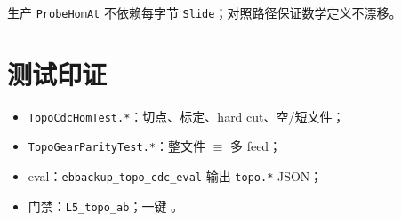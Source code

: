 生产 \texttt{ProbeHomAt} 不依赖每字节 \texttt{Slide}；对照路径保证数学定义不漂移。

\section{测试印证}

\begin{itemize}[nosep]
  \item \texttt{TopoCdcHomTest.*}：切点、标定、hard cut、空/短文件；
  \item \texttt{TopoGearParityTest.*}：整文件 $\equiv$ 多 feed；
  \item eval：\texttt{ebbackup\_topo\_cdc\_eval} 输出 \texttt{topo.*} JSON；
  \item 门禁：\texttt{L5\_topo\_ab}；一键 。
\end{itemize}
